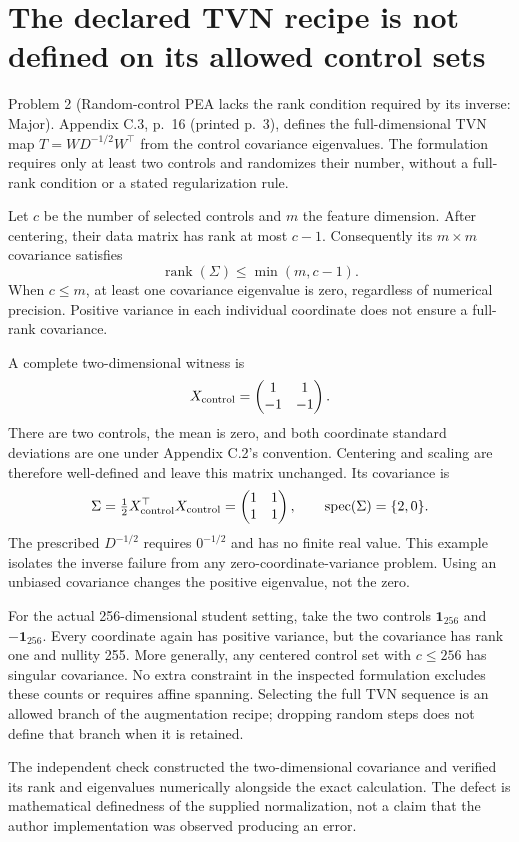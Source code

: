 \documentclass[10pt]{article}
\begin{document}
\section*{The declared TVN recipe is not defined on its allowed control sets}
Problem 2 (Random-control PEA lacks the rank condition required by its inverse: Major).  Appendix C.3, p. 16 (printed p. 3), defines the full-dimensional TVN map \(T=WD^{-1/2}W^\top\) from the control covariance eigenvalues. The formulation requires only at least two controls and randomizes their number, without a full-rank condition or a stated regularization rule.\par
Let \(c\) be the number of selected controls and \(m\) the feature dimension. After centering, their data matrix has rank at most \(c-1\). Consequently its \(m\times m\) covariance satisfies \[\operatorname{rank}(\Sigma)\le\min(m,c-1).\] When \(c\le m\), at least one covariance eigenvalue is zero, regardless of numerical precision. Positive variance in each individual coordinate does not ensure a full-rank covariance.\par
A complete two-dimensional witness is \[X_{\rm control}=
\begin{pmatrix}1&1\\-1&-1\end{pmatrix}.\] There are two controls, the mean is zero, and both coordinate standard deviations are one under Appendix C.2’s convention. Centering and scaling are therefore well-defined and leave this matrix unchanged. Its covariance is \[\Sigma=\tfrac12X_{\rm control}^{\top}X_{\rm control}
=\begin{pmatrix}1&1\\1&1\end{pmatrix},
\qquad \operatorname{spec}(\Sigma)=\{2,0\}.\] The prescribed \(D^{-1/2}\) requires \(0^{-1/2}\) and has no finite real value. This example isolates the inverse failure from any zero-coordinate-variance problem. Using an unbiased covariance changes the positive eigenvalue, not the zero.\par
For the actual 256-dimensional student setting, take the two controls \(\mathbf1_{256}\) and \(-\mathbf1_{256}\). Every coordinate again has positive variance, but the covariance has rank one and nullity 255. More generally, any centered control set with \(c\le256\) has singular covariance. No extra constraint in the inspected formulation excludes these counts or requires affine spanning. Selecting the full TVN sequence is an allowed branch of the augmentation recipe; dropping random steps does not define that branch when it is retained.\par
The independent check constructed the two-dimensional covariance and verified its rank and eigenvalues numerically alongside the exact calculation. The defect is mathematical definedness of the supplied normalization, not a claim that the author implementation was observed producing an error.\par
\end{document}
